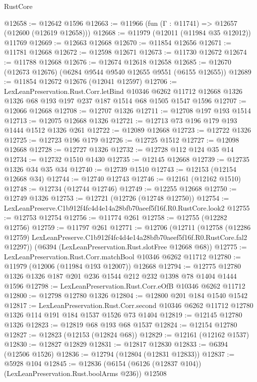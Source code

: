 \begin{lexlean}{RustCore}
\begin{coremodule}
@12658 := @12642 @1596
@12663 := @11966 (fun (Γ : @11741) => @12657 (@12600 (@12619 @12658)))
@12668 := @11979 (@12011 (@11984 @35 @12012)) @11769
@12669 := @12663 @12668
@12670 := @11854 @12656
@12671 := @11781 @12668
@12672 := @12598 @12671
@12673 := @11730 @12672
@12674 := @11788 @12668
@12676 := @12674 @12618 @12658
@12685 := @12670 (@12673 @12676) (@6284 @9544 @9540 @12655 @9551 (@6155 @12655))
@12689 := @11854 @12672 @12676 (@12041 @12597)
@12706 := LexLeanPreservation.Rust.Corr.letBind
    @10346
    @6262
    @11712
    @12668
    @1326
    @1326
    @68
    @193
    @197
    @237
    @187
    @1514
    @68
    @1505
    @1547
    @1596
@12707 := @12066 @12668
@12708 := @12707 @1326
@12711 := @12708 @197 @193 @1514
@12713 := @12075 @12668 @1326
@12721 := @12713 @73 @196 @179 @193 @1444 @1512 @1326 @261
@12722 := @12089 @12668
@12723 := @12722 @1326
@12725 := @12723 @196 @179
@12726 := @12725 @1512
@12727 := @12098 @12668
@12728 := @12727 @1326
@12732 := @12728 @112 @124 @35 @14
@12734 := @12732 @1510 @1430
@12735 := @12145 @12668
@12739 := @12735 @1326 @34 @35 @34
@12740 := @12739 @1510
@12743 := @12153 (@12154 @12668 @34)
@12744 := @12740 @12743
@12746 := @12161 (@12162 @1510)
@12748 := @12734 (@12744 @12746)
@12749 := @12255 @12668
@12750 := @12749 @1326
@12753 := @12721 (@12726 (@12748 @12750))
@12754 := LexLeanPreserve.C1b912f4fc4d4e14a28bfb70aeef5f16f.R0.RustCore.look2
@12755 := @12753 @12754
@12756 := @11774 @261
@12758 := @12755 (@12282 @12756)
@12759 := @11797 @261
@12771 := @12706
    (@12711
      (@12758
        (@12286 @12759)
        LexLeanPreserve.C1b912f4fc4d4e14a28bfb70aeef5f16f.R0.RustCore.fal2
        @12297))
    (@6394 (LexLeanPreservation.Rust.slotFree @12668 @68))
@12775 := LexLeanPreservation.Rust.Corr.matchBool @10346 @6262 @11712
@12780 := @11979 (@12006 (@11984 @193 @12007)) @12668
@12794 := @12775 @12780 @1326 @1326 @187 @201 @236 @1544 @212 @232 @1398 @78 @1404 @1444 @1596
@12798 := LexLeanPreservation.Rust.Corr.eOfB @10346 @6262 @11712
@12800 := @12798 @12780 @1326
@12804 := @12800 @201 @184 @1540 @1542
@12817 := LexLeanPreservation.Rust.Corr.second
    @10346
    @6262
    @11712
    @12780
    @1326
    @114
    @191
    @184
    @1537
    @1526
    @73
    @1404
@12819 := @12145 @12780 @1326
@12823 := @12819 @68 @193 @68 @1537
@12824 := @12154 @12780
@12827 := @12823 (@12153 (@12824 @68))
@12829 := @12161 (@12162 @1537)
@12830 := @12827 @12829
@12831 := @12817 @12830
@12833 := @6394 (@12506 @1526)
@12836 := @12794 (@12804 (@12831 @12833))
@12837 := @5928 @104
@12845 := @12836 (@6154 (@6126 (@12837 @104)) (LexLeanPreservation.Rust.boolArms @236)) @12508

\end{coremodule}
\end{lexlean}
